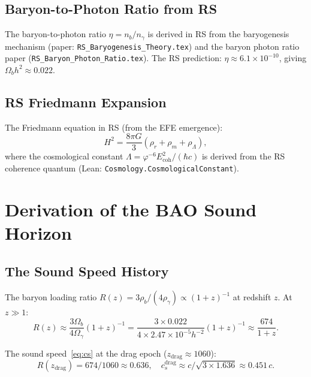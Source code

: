 \documentclass[12pt,a4paper]{article}
\theoremstyle{definition}
\theoremstyle{remark}
\begin{document}
\subsection{Baryon-to-Photon Ratio from RS}

The baryon-to-photon ratio $\eta = n_b/n_\gamma$ is derived in RS from
the baryogenesis mechanism (paper: \texttt{RS\_Baryogenesis\_Theory.tex})
and the baryon photon ratio paper (\texttt{RS\_Baryon\_Photon\_Ratio.tex}).
The RS prediction: $\eta \approx 6.1 \times 10^{-10}$, giving
$\Omega_b h^2 \approx 0.022$.

\subsection{RS Friedmann Expansion}

The Friedmann equation in RS (from the EFE emergence):
\begin{equation}
  H^2 = \frac{8\pi G}{3}\left(\rho_r + \rho_m + \rho_\Lambda\right),
\end{equation}
where the cosmological constant $\Lambda = \varphi^{-6}E_\mathrm{coh}^2/
(\hbar c)$ is derived from the RS coherence quantum
(Lean: \texttt{Cosmology.CosmologicalConstant}).

\section{Derivation of the BAO Sound Horizon}
\label{sec:derivation}

\subsection{The Sound Speed History}

The baryon loading ratio $R(z) = 3\rho_b/(4\rho_\gamma) \propto (1+z)^{-1}$
at redshift $z$.  At $z \gg 1$:
\begin{equation}
  R(z) \approx \frac{3\Omega_b}{4\Omega_\gamma}(1+z)^{-1}
  = \frac{3 \times 0.022}{4 \times 2.47\times10^{-5} h^{-2}}(1+z)^{-1}
  \approx \frac{674}{1+z}.
\end{equation}

The sound speed~\eqref{eq:cs} at the drag epoch ($z_\mathrm{drag}
\approx 1060$):
\begin{equation}
  R(z_\mathrm{drag}) = 674/1060 \approx 0.636,
  \quad c_s^\mathrm{drag} \approx c/\sqrt{3 \times 1.636} \approx 0.451\,c.
\end{equation}
\end{document}

